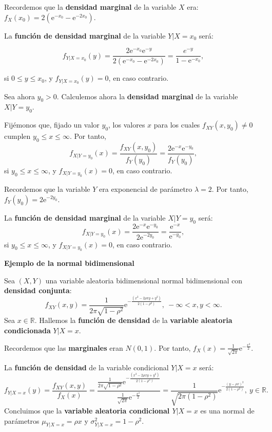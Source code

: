 \documentclass[]{book}
\begin{document}
Recordemos que la \textbf{densidad marginal} de la variable \(X\) era: \(f_X(x_0)=2\left(\mathrm{e}^{-x_0}-\mathrm{e}^{-2x_0}\right)\).

La \textbf{función de densidad marginal} de la variable \(Y|X=x_0\) será:

\[
f_{Y|X=x_0}(y)=\frac{2\mathrm{e}^{-x_0}\mathrm{e}^{-y}}{2\left(\mathrm{e}^{-x_0}-\mathrm{e}^{-2x_0}\right)}=\frac{e^{-y}}{1-\mathrm{e}^{-x_0}},
\]

si \(0\leq y\leq x_0\), y \(f_{Y|X=x_0}(y)=0\), en caso contrario.

Sea ahora \(y_0>0\). Calculemos ahora la \textbf{densidad marginal} de la variable \(X|Y=y_0\).

Fijémonos que, fijado un valor \(y_0\), los valores \(x\) para los cuales \(f_{XY}(x,y_0)\neq 0\) cumplen \(y_0\leq x\leq \infty\). Por tanto,
\[
f_{X|Y=y_0}(x)=\frac{f_{XY}(x,y_0)}{f_Y(y_0)}=\frac{2\mathrm{e}^{-x}\mathrm{e}^{-y_0}}{f_Y(y_0)},
\]
si \(y_0\leq x\leq \infty\), y \(f_{X|Y=y_0}(x)=0\), en caso contrario.

Recordemos que la variable \(Y\) era exponencial de parámetro \(\lambda=2\). Por tanto, \(f_Y(y_0)=2\mathrm{e}^{-2y_0}\).

La \textbf{función de densidad marginal} de la variable \(X|Y=y_0\) será:
\[
f_{X|Y=y_0}(x)=\frac{2\mathrm{e}^{-x}\mathrm{e}^{-y_0}}{2\mathrm{e}^{-2y_0}}=\frac{\mathrm{e}^{-x}}{\mathrm{e}^{-y_0}},
\]
si \(y_0\leq x\leq \infty\), y \(f_{X|Y=y_0}(x)=0\), en caso contrario.

\textbf{Ejemplo de la normal bidimensional}

Sea \((X,Y)\) una variable aleatoria bidimensional normal bidimensional con \textbf{densidad conjunta}:
\[
f_{XY}(x,y)=\frac{1}{2\pi\sqrt{1-\rho^2}}\mathrm{e}^{-\frac{(x^2-2\rho xy+y^2)}{2(1-\rho^2)}},\ -\infty <x,y<\infty.
\]
Sea \(x\in\mathbb{R}\). Hallemos la \textbf{función de densidad} de la \textbf{variable aleatoria condicionada} \(Y|X=x\).

Recordemos que las \textbf{marginales} eran \(N(0,1)\). Por tanto, \(f_X(x)=\frac{1}{\sqrt{2\pi}}\mathrm{e}^{-\frac{x^2}{2}}.\)

La \textbf{función de densidad} de la variable condicional \(Y|X=x\) será:
\[
f_{Y|X=x}(y)=\frac{f_{XY}(x,y)}{f_X(x)}=\frac{\frac{1}{2\pi\sqrt{1-\rho^2}}\mathrm{e}^{-\frac{(x^2-2\rho xy+y^2)}{2(1-\rho^2)}}}{\frac{1}{\sqrt{2\pi}}\mathrm{e}^{-\frac{x^2}{2}}}=\frac{1}{\sqrt{2\pi (1-\rho^2)}}\mathrm{e}^{-\frac{(y-\rho x)^2}{2(1-\rho^2)}},\ y\in\mathbb{R}.
\]
Concluimos que la \textbf{variable aleatoria condicional \(Y|X=x\)} es una normal de parámetros \(\mu_{Y|X=x}=\rho x\) y \(\sigma_{Y|X=x}^2 =1-\rho^2\).
\end{document}
